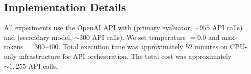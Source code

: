 \subsection{Implementation Details}

All experiments use the OpenAI API with \gptfull (primary evaluator, ${\sim}955$ API calls) and \gptmini (secondary model, ${\sim}300$ API calls). We set temperature $= 0.0$ and max tokens $= 300$--$400$. Total execution time was approximately 52 minutes on CPU-only infrastructure for API orchestration. The total cost was approximately ${\sim}1{,}255$ API calls.

